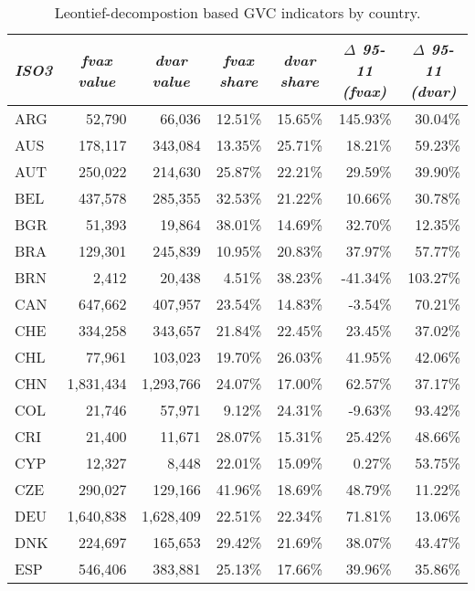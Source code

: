 \documentclass[a4paper,11pt]{article}
\begin{document}
\begin{table}[h]\small
  \centering
       \caption{Leontief-decompostion based GVC indicators by country.}
           \hspace*{-1.1cm}
    \begin{tabular}{lrrrrrr}
    \toprule
    \multicolumn{1}{l}{\textit{ISO3}} & \multicolumn{1}{c}{\textit{fvax value}} & \multicolumn{1}{c}{\textit{dvar value}} & \multicolumn{1}{c}{\textit{fvax share}} & \multicolumn{1}{c}{\textit{dvar share}} & \multicolumn{1}{c}{\textit{$\Delta$ 95-11 (fvax)}} & \multicolumn{1}{c}{\textit{$\Delta$ 95-11  (dvar)}} \\
    \midrule
    ARG   & 52,790 & 66,036 & 12.51\% & 15.65\% & 145.93\% & 30.04\% \\
    AUS   & 178,117 & 343,084 & 13.35\% & 25.71\% & 18.21\% & 59.23\% \\
    AUT   & 250,022 & 214,630 & 25.87\% & 22.21\% & 29.59\% & 39.90\% \\
    BEL   & 437,578 & 285,355 & 32.53\% & 21.22\% & 10.66\% & 30.78\% \\
    BGR   & 51,393 & 19,864 & 38.01\% & 14.69\% & 32.70\% & 12.35\% \\
    BRA   & 129,301 & 245,839 & 10.95\% & 20.83\% & 37.97\% & 57.77\% \\
    BRN   & 2,412 & 20,438 & 4.51\% & 38.23\% & -41.34\% & 103.27\% \\
    CAN   & 647,662 & 407,957 & 23.54\% & 14.83\% & -3.54\% & 70.21\% \\
    CHE   & 334,258 & 343,657 & 21.84\% & 22.45\% & 23.45\% & 37.02\% \\
    CHL   & 77,961 & 103,023 & 19.70\% & 26.03\% & 41.95\% & 42.06\% \\
    CHN   & 1,831,434 & 1,293,766 & 24.07\% & 17.00\% & 62.57\% & 37.17\% \\
    COL   & 21,746 & 57,971 & 9.12\% & 24.31\% & -9.63\% & 93.42\% \\
    CRI   & 21,400 & 11,671 & 28.07\% & 15.31\% & 25.42\% & 48.66\% \\
    CYP   & 12,327 & 8,448 & 22.01\% & 15.09\% & 0.27\% & 53.75\% \\
    CZE   & 290,027 & 129,166 & 41.96\% & 18.69\% & 48.79\% & 11.22\% \\
    DEU   & 1,640,838 & 1,628,409 & 22.51\% & 22.34\% & 71.81\% & 13.06\% \\
    DNK   & 224,697 & 165,653 & 29.42\% & 21.69\% & 38.07\% & 43.47\% \\
    ESP   & 546,406 & 383,881 & 25.13\% & 17.66\% & 39.96\% & 35.86\% \\

\end{tabular}
\end{table}
\end{document}
